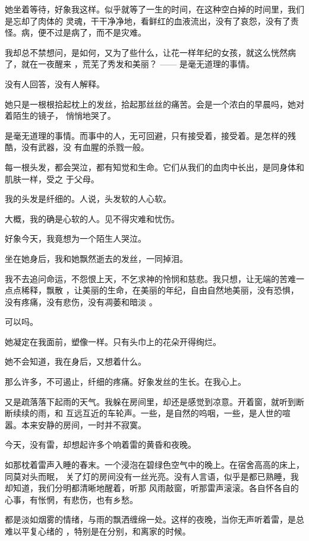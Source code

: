 \documentclass[12pt,a4paper]{article}
\begin{document}
		她坐着等待，好象我这样。似乎就等了一生的时间，在这种空白掉的时间里，我们是忘却了肉体的
	灵魂，干干净净地，看鲜红的血液流出，没有了哀怨，没有了责怪。病，便不过是病了，而不是灾难。


		我却总不禁想问，是如何，又为了些什么，让花一样年纪的女孩，就这么恍然病了，就在一夜醒来
	，荒芜了秀发和美丽？ —— 是毫无道理的事情。

		没有人回答，没有人解释。

		她只是一根根拾起枕上的发丝，拾起那丝丝的痛苦。会是一个浓白的早晨吗，她对着陌生的镜子，
	悄悄地哭了。

		是毫无道理的事情。而事中的人，无可回避，只有接受着，接受着。是怎样的残酷，没有武器，没
	有血腥的杀戮一般。

		每一根头发，都会哭泣，都有知觉和生命。它们从我们的血肉中长出，是同身体和肌肤一样，受之
	于父母。

		我的头发是纤细的。人说，头发软的人心软。

		大概，我的确是心软的人。见不得灾难和忧伤。


		好象今天，我竟想为一个陌生人哭泣。

		坐在她身后，我和她飘然逝去的发丝，一同掉泪。

		我不去追问命运，不怨恨上天，不乞求神的怜悯和慈悲。我只想，让无端的苦难一点点稀释，飘散
	，让美丽的生命，在美丽的年纪，自由自然地美丽，没有恐惧，没有疼痛，没有悲伤，没有凋萎和暗淡
	。

		可以吗。

		她凝定在我面前，塑像一样。只有头巾上的花朵开得绚烂。

		她不会知道，我在身后，又想着什么。

		那么许多，不可遏止，纤细的疼痛。好象发丝的生长。在我心上。

	\endwriting



		又是疏落落下起雨的天气。我躲在房间里，却还是感觉到凉意。开着窗，就听到断断续续的雨，和
	互远互近的车轮声。一些，是自然的呜咽，一些，是人世的喧嚣。本来安静的房间，一时并不寂寞。


		今天，没有雷，却想起许多个响着雷的黄昏和夜晚。


		如那枕着雷声入睡的春末。一个浸泡在碧绿色空气中的晚上。在宿舍高高的床上，同莫对头而眠，
	关了灯的房间没有一丝光亮。没有人言语，似乎是都已熟睡，我却知道，我们分明都清晰地醒着，听那
	风雨敲窗，听那雷声滚滚。各自怀各自的心事，有怅惘，有悲伤，也有乡愁。


		都是淡如烟雾的情绪，与雨的飘洒缠绵一处。这样的夜晚，当你无声听着雷，是总难以平复心绪的
	，特别是在分别，和离家的时候。
\end{document}
